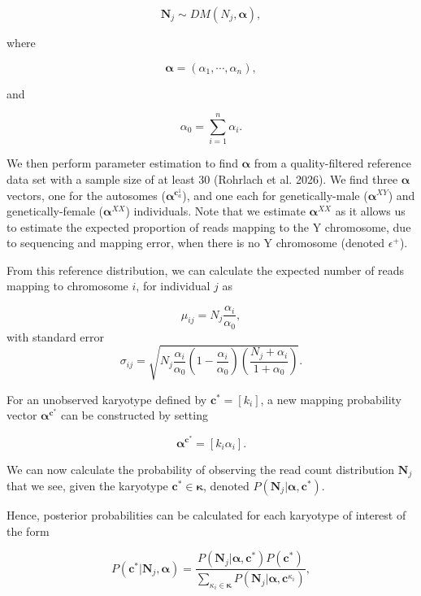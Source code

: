 \documentclass[
  letterpaper,
  DIV=11,
  numbers=noendperiod]{scrartcl}
\begin{document}
\[
\boldsymbol{N}_j \sim DM\left(N_j,\boldsymbol{\alpha}\right),
\]

where

\[
\boldsymbol{\alpha} = \left(\alpha_1,\cdots,\alpha_n \right),
\]

and

\[
\alpha_0 = \sum_{i=1}^{n}\alpha_i.
\]

We then perform parameter estimation to find \(\boldsymbol{\alpha}\)
from a quality-filtered reference data set with a sample size of at
least 30 (Rohrlach et al. 2026). We find three \(\boldsymbol{\alpha}\)
vectors, one for the autosomes
(\(\boldsymbol{\alpha}^{\boldsymbol{c}^{1}_{a}}\)), and one each for
genetically-male (\(\boldsymbol{\alpha}^{XY}\)) and genetically-female
(\(\boldsymbol{\alpha}^{XX}\)) individuals. Note that we estimate
\(\boldsymbol{\alpha}^{XX}\) as it allows us to estimate the expected
proportion of reads mapping to the Y chromosome, due to sequencing and
mapping error, when there is no Y chromosome (denoted \(\epsilon^+\)).

From this reference distribution, we can calculate the expected number
of reads mapping to chromosome \(i\), for individual \(j\) as

\[
\mu_{ij} = N_{j}\dfrac{\alpha_i}{\alpha_0},
\] with standard error \[
\sigma_{ij} = \sqrt{N_j\dfrac{\alpha_i}{\alpha_0}\left(1-\dfrac{\alpha_i}{\alpha_0} \right) \left(\dfrac{N_j + \alpha_i}{1 + \alpha_0} \right)}.
\]

For an unobserved karyotype defined by
\(\boldsymbol{c}^* = \left[k_i\right]\), a new mapping probability
vector \(\boldsymbol{\alpha}^{\boldsymbol{c}^*}\) can be constructed by
setting

\[
\boldsymbol{\alpha}^{\boldsymbol{c}^*} = \left[ k_i \alpha_i \right].
\]

We can now calculate the probability of observing the read count
distribution \(\boldsymbol{N}_j\) that we see, given the karyotype
\(\boldsymbol{c}^* \in \boldsymbol{\kappa}\), denoted
\(P\left( \boldsymbol{N}_j \big\vert \boldsymbol{\alpha}, \boldsymbol{c}^* \right)\).

Hence, posterior probabilities can be calculated for each karyotype of
interest of the form

\[
P\left(\boldsymbol{c}^*\big\vert \boldsymbol{N}_j,\boldsymbol{\alpha}\right) = \dfrac{P\left( \boldsymbol{N}_j \big\vert \boldsymbol{\alpha}, \boldsymbol{c}^* \right)P\left(\boldsymbol{c}^* \right)}{\sum_{\kappa_i\in\boldsymbol{\kappa}} P\left( \boldsymbol{N}_j \big\vert \boldsymbol{\alpha}, \boldsymbol{c}^{\kappa_i} \right)},
\]
\end{document}
